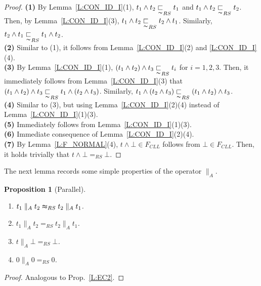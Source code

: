 \documentclass{elsarticle}
\theoremstyle{plain}
\newtheorem{proposition}[theorem]{Proposition}
\theoremstyle{definition}
\begin{document}
\begin{proof}
  \noindent \textbf{(1)} By Lemma~\ref{L:CON_ID_I}(1), $t_1  \wedge t_2 \underset{\thicksim}{\sqsubset}_{RS} t_1$ and $t_1  \wedge t_2 \underset{\thicksim}{\sqsubset}_{RS} t_2$.
  Then, by Lemma~\ref{L:CON_ID_I}(3), $t_1  \wedge t_2 \underset{\thicksim}{\sqsubset}_{RS} t_2 \wedge t_1$. Similarly, $t_2  \wedge t_1 \underset{\thicksim}{\sqsubset}_{RS} t_1 \wedge t_2$.\\

\noindent \textbf{(2)} Similar to (1), it follows from Lemma~\ref{L:CON_ID_I}(2) and \ref{L:CON_ID_I}(4).\\

\noindent \textbf{(3)} By Lemma~\ref{L:CON_ID_I}(1), $(t_1  \wedge t_2) \wedge t_3 \underset{\thicksim}{\sqsubset}_{RS} t_i $ for $i=1,2,3$.
Then, it immediately follows from Lemma~\ref{L:CON_ID_I}(3) that $(t_1  \wedge t_2) \wedge t_3 \underset{\thicksim}{\sqsubset}_{RS} t_1 \wedge (t_2 \wedge t_3)$.
Similarly, $t_1  \wedge (t_2 \wedge t_3) \underset{\thicksim}{\sqsubset}_{RS} (t_1 \wedge t_2) \wedge t_3$. \\

\noindent \textbf{(4)}
Similar to (3), but using Lemma~\ref{L:CON_ID_I}(2)(4) instead of Lemma~\ref{L:CON_ID_I}(1)(3).\\

\noindent \textbf{(5)} Immediately follows from Lemma~\ref{L:CON_ID_I}(1)(3).\\

\noindent \textbf{(6)} Immediate consequence of Lemma~\ref{L:CON_ID_I}(2)(4).\\

\noindent \textbf{(7)} By Lemma~\ref{L:F_NORMAL}(4), $t \wedge \bot \in F_{{CLL}}$ follows from $\bot \in F_{{CLL}}$. Then, it holds trivially that $t \wedge \bot =_{RS} \bot$.
\end{proof}

The next lemma records some simple properties of the operator $\parallel_A$.

\begin{proposition}[Parallel]\label{S:PARALLEL}\hfill
    \begin{enumerate}
      \item $t_1 \parallel_A t_2 \thickapprox_{RS} t_2 \parallel_A t_1$.
      \item $t_1 \parallel_A t_2 =_{RS} t_2 \parallel_A t_1$.
      \item $t \parallel_A \bot =_{RS} \bot$.
      \item $0 \parallel_A 0 =_{RS} 0$.
\end{enumerate}
\end{proposition}
\begin{proof}
  Analogous to Prop.~\ref{L:EC2}.
\end{proof}
\end{document}
